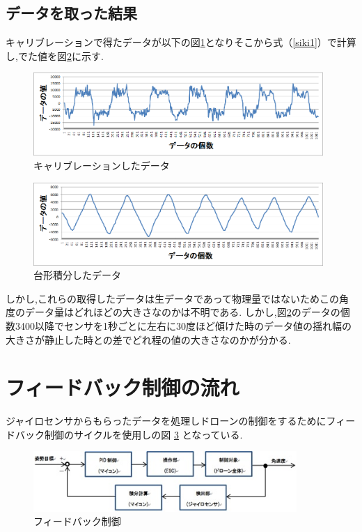 \documentclass[12pt,oneside]{paper}
\begin{document}
\subsection{データを取った結果}
キャリブレーションで得たデータが以下の図\ref{fig:jiken_vero}となりそこから式（\ref{siki1}）で計算し,でた値を図\ref{fig:jiken}に示す.

\begin{figure}[H]
  \begin{center}
    \includegraphics[width=110mm]{ga/jiken_vero.png}
    \end{center}
  \caption{キャリブレーションしたデータ}
 \label{fig:jiken_vero}
\end{figure}

\begin{figure}[H]
  \begin{center}
    \includegraphics[width=110mm]{ga/jiken.png}
    \end{center}
  \caption{台形積分したデータ}
 \label{fig:jiken}
\end{figure}

しかし,これらの取得したデータは生データであって物理量ではないためこの角度のデータ量はどれほどの大きさなのかは不明である.
しかし,図\ref{fig:jiken}のデータの個数3400以降でセンサを1秒ごとに左右に30度ほど傾けた時のデータ値の揺れ幅の大きさが静止した時との差でどれ程の値の大きさなのかが分かる.


\section{フィードバック制御の流れ}
ジャイロセンサからもらったデータを処理しドローンの制御をするためにフィードバック制御のサイクルを使用しの図 \ref{fig:seigyo} となっている.

\begin{figure}[H]
  \begin{center}
    \includegraphics[width=100mm]{ga/seigyo.jpg}
    \end{center}
  \caption{フィードバック制御}
 \label{fig:seigyo}
\end{figure}
\end{document}
